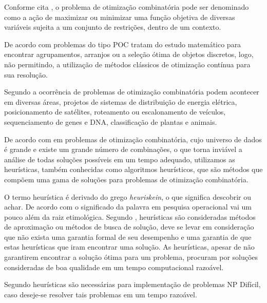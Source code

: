 Conforme cita \cite{raupp2003introduccao}, o problema de otimização combinatória pode ser denominado como a ação de maximizar ou minimizar uma função objetiva de diversas variáveis sujeita a um conjunto de restrições, dentro de um contexto.\par

De acordo com \cite{opac-b1092847} problemas do tipo POC tratam do estudo matemático para encontrar agrupamentos, arranjos ou a seleção ótima de objetos discretos, logo, não permitindo, a utilização de métodos clássicos de otimização contínua para sua resolução.\par


Segundo \cite{golbarg2000otimizaccao} a ocorrência de problemas de otimização combinatória podem acontecer em diversas áreas, projetos de sistemas de distribuição de energia elétrica, posicionamento de satélites, roteamento ou escalonamento de veículos, sequenciamento de genes e DNA, classificação de plantas e animais.\par

De acordo com \cite{deleonardo} em problemas de otimização combinatória, cujo universo de dados é grande e existe um grande número de combinações, o que torna inviável a análise de todas soluções possíveis em um tempo adequado, utilizamos as heurísticas, também conhecidas como algoritmos heurísticos, que são métodos que compõem uma gama de soluções para problemas de otimização combinatória.


O termo heurística é derivado do grego \textit{heuriskein}, o que significa descobrir ou achar. De acordo com \cite{timoteo2005desenvolvimento} o significado da palavra em pesquisa operacional vai um pouco além da raiz etimológica. Segundo \cite{steiglitz1982combinatorial}, heurísticas são consideradas métodos de aproximação ou métodos de busca de solução, deve se levar em consideração que não exista uma garantia formal de seu desempenho e uma garantia de que estas heurísticas que iram encontrar uma solução. As heurísticas, apesar de não garantirem encontrar a solução ótima para um problema, procuram por soluções consideradas de boa qualidade em um tempo computacional razoável.\par

Segundo \cite{evans1992optimization} heurísticas são necessárias para implementação de problemas NP Difícil, caso deseje-se resolver tais problemas em um tempo  razoável.\par

